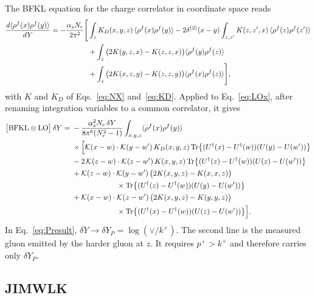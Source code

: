 \documentclass[aps,prd,onecolumn,superscriptaddress,nofootinbib,floatfix,longbibliography,11pt]{revtex4-2}
\numberwithin{equation}{section}
\newcommand{\KK}{\mathcal{K}}
\newcommand{\Ud}{U^{\dagger}}
\newcommand{\Tr}{\mathrm{Tr}}
\begin{document}
The BFKL equation for the charge correlator in coordinate space reads
\begin{align}
\frac{d\langle\rho^f(x)\rho^f(y)\rangle}{dY}=-\frac{\alpha_sN_c}{2\pi^2}\Bigg[&\int_zK_D(x,y,z)\,\langle\rho^f(x)\rho^f(y)\rangle-2\delta^{(2)}(x-y)\int_{z,z'}K(z,z',x)\,\langle\rho^f(z)\rho^f(z')\rangle\notag\\
&+\int_z\big(2K(y,z,x)-K(z,z,x)\big)\langle\rho^f(y)\rho^f(z)\rangle\notag\\
&+\int_z\big(2K(x,z,y)-K(z,z,y)\big)\langle\rho^f(x)\rho^f(z)\rangle\Bigg],
\label{eq:vBFKL}
\end{align}
with $K$ and $K_D$ of Eqs.~\eqref{eq:NX} and~\eqref{eq:KD}. Applied to Eq.~\eqref{eq:LOx}, after renaming integration variables to a common correlator, it gives
\begin{align}
\big[{\rm BFKL}\otimes{\rm LO}\big]\,\delta Y={}&-\frac{\alpha_s^2N_c\,\delta Y}{8\pi^6(N_c^2-1)}\int_{x,y,z}\langle\rho^f(x)\rho^f(y)\rangle\notag\\
&\times\Big[\KK(x-w)\cdot\KK(y-w')\,K_D(x,y,z)\,\Tr\big\{(\Ud(x)-\Ud(w))(U(y)-U(w'))\big\}\notag\\
&-2\,\KK(z-w)\cdot\KK(z-w')\,K(x,y,z)\,\Tr\big\{(\Ud(z)-\Ud(w))(U(z)-U(w'))\big\}\notag\\
&+\KK(z-w)\cdot\KK(y-w')\,\big(2K(x,y,z)-K(x,x,z)\big)\notag\\
&\hspace{6em}\times\Tr\big\{(\Ud(z)-\Ud(w))(U(y)-U(w'))\big\}\notag\\
&+\KK(x-w)\cdot\KK(z-w')\,\big(2K(x,y,z)-K(y,y,z)\big)\notag\\
&\hspace{6em}\times\Tr\big\{(\Ud(x)-\Ud(w))(U(z)-U(w'))\big\}\Big].
\label{eq:LOBFKL}
\end{align}
In Eq.~\eqref{eq:Presult}, $\delta Y\to\delta Y_P=\log(\vee/k^+)$. The second line is the measured gluon emitted by the harder gluon at $z$. It requires $p^+>k^+$ and therefore carries only $\delta Y_P$.

\subsection{JIMWLK}
\end{document}
